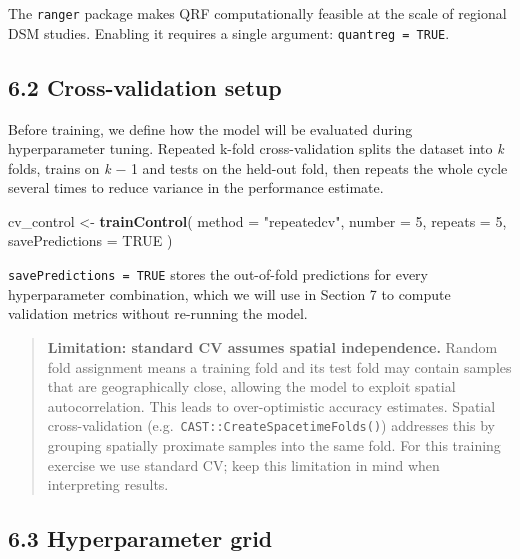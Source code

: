 \documentclass[
  10pt,
  b5paper,
  oneside]{book}
\newenvironment{Shaded}{\begin{snugshade}}{\end{snugshade}}
\newcommand{\AttributeTok}[1]{\textcolor[rgb]{0.13,0.29,0.53}{#1}}
\newcommand{\ConstantTok}[1]{\textcolor[rgb]{0.56,0.35,0.01}{#1}}
\newcommand{\DecValTok}[1]{\textcolor[rgb]{0.00,0.00,0.81}{#1}}
\newcommand{\FunctionTok}[1]{\textcolor[rgb]{0.13,0.29,0.53}{\textbf{#1}}}
\newcommand{\NormalTok}[1]{#1}
\newcommand{\OtherTok}[1]{\textcolor[rgb]{0.56,0.35,0.01}{#1}}
\newcommand{\StringTok}[1]{\textcolor[rgb]{0.31,0.60,0.02}{#1}}
\begin{document}
The \texttt{ranger} package makes QRF computationally feasible at the scale of regional DSM studies. Enabling it requires a single argument: \texttt{quantreg\ =\ TRUE}.

\subsection*{6.2 Cross-validation setup}\label{cross-validation-setup}

Before training, we define how the model will be evaluated during hyperparameter tuning. Repeated k-fold cross-validation splits the dataset into \emph{k} folds, trains on \emph{k} − 1 and tests on the held-out fold, then repeats the whole cycle several times to reduce variance in the performance estimate.

\begin{Shaded}
\begin{Highlighting}[]
\NormalTok{cv\_control }\OtherTok{\textless{}{-}} \FunctionTok{trainControl}\NormalTok{(}
  \AttributeTok{method =} \StringTok{"repeatedcv"}\NormalTok{,}
  \AttributeTok{number =} \DecValTok{5}\NormalTok{,}
  \AttributeTok{repeats =} \DecValTok{5}\NormalTok{,}
  \AttributeTok{savePredictions =} \ConstantTok{TRUE}
\NormalTok{)}
\end{Highlighting}
\end{Shaded}

\texttt{savePredictions\ =\ TRUE} stores the out-of-fold predictions for every hyperparameter combination, which we will use in Section 7 to compute validation metrics without re-running the model.

\begin{quote}
\textbf{Limitation: standard CV assumes spatial independence.} Random fold assignment means a training fold and its test fold may contain samples that are geographically close, allowing the model to exploit spatial autocorrelation. This leads to over-optimistic accuracy estimates. Spatial cross-validation (e.g.~\texttt{CAST::CreateSpacetimeFolds()}) addresses this by grouping spatially proximate samples into the same fold. For this training exercise we use standard CV; keep this limitation in mind when interpreting results.
\end{quote}

\subsection*{6.3 Hyperparameter grid}\label{hyperparameter-grid}
\end{document}
